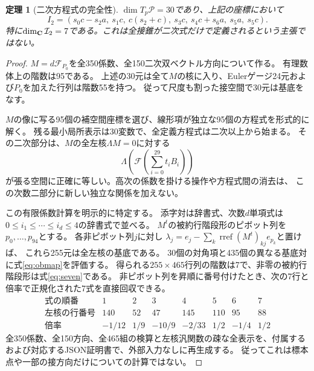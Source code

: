 \documentclass[a4paper,11pt]{ltjsarticle}
\newtheorem{theorem}{定理}[section]
\theoremstyle{remark}\newtheorem{remark}[theorem]{注意}
\begin{document}
\begin{theorem}[二次方程式の完全性]\label{thm:quadrics}
$\dim T_p\mathcal P=30$であり、上記の座標において
\begin{equation}\label{eq:seven}
\boxed{\quad
 I_2=(s_0c-s_2a,\ s_1c,\ c(s_2+c),\ s_3c,
             \ s_4c+s_6a,\ s_5a,\ s_5c).\quad}
\end{equation}
特に$\dim_\mathbf C\mathcal I_2=7$である。これは全接錐が二次式だけで定義されるという主張ではない。
\end{theorem}
\begin{proof}
$M=d\mathcal F_{P_0}$を全350係数、全150二次双ベクトル方向について作る。
有理数体上の階数は95である。
上述の30元は全て$M$の核に入り、Eulerゲージ24元および$P_0$を加えた行列は階数55を持つ。
従って尺度も割った接空間で30元は基底をなす。

$M$の像に写る95個の補空間座標を選び、線形項が独立な95個の方程式を形式的に解く。
残る最小局所表示は30変数で、全定義方程式は二次以上から始まる。
その二次部分は、$M$の全左核$\Lambda M=0$に対する
\begin{equation}\label{eq:obmap}
 \Lambda\!\left(\mathcal F\!\left(\sum_{i=0}^{29}t_iB_i\right)\right)
\end{equation}
が張る空間に正確に等しい。高次の係数を掛ける操作や方程式間の消去は、
この次数二部分に新しい独立な関係を加えない。

この有限係数計算を明示的に特定する。
添字対は辞書式、次数$d$単項式は$0\le i_1\le\cdots\le i_d\le4$の辞書式で並べる。
$M^t$の被約行階段形のピボット列を$p_0,\ldots,p_{94}$とする。
各非ピボット列$j$に対し
$\lambda_j=e_j-\sum_k\operatorname{rref}(M^t)_{kj}e_{p_k}$と置けば、
これら255元は全左核の基底である。
30個の対角項と435個の異なる基底対に式\eqref{eq:obmap}を評価する。
得られる$255\times465$行列の階数は7で、非零の被約行階段形は式\eqref{eq:seven}である。
非ピボット列を昇順に番号付けたとき、次の7行と倍率で正規化された7式を直接回収できる。
\[
\begin{array}{c|rrrrrrr}
 \text{式の順番}&1&2&3&4&5&6&7\\\hline
 \text{左核の行番号}&140&52&47&145&110&95&88\\
 \text{倍率}&-1/12&1/9&-10/9&-2/33&1/2&-1/4&1/2
\end{array}
\]
全350係数、全150方向、全465組の検算と左核汎関数の疎な全表示を、付属する
および対応するJSON証明書で、外部入力なしに再生成する。
従ってこれは標本点や一部の接方向だけについての計算ではない。
\end{proof}
\end{document}
